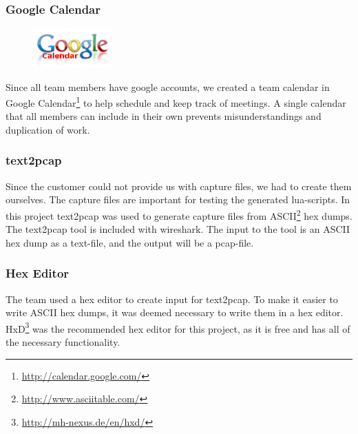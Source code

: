 \subsubsection{Google Calendar}
\begin{figure}
	\vspace{-20pt}
	\includegraphics[width=3cm]{./planning/img/google_calendar_logo}
	\vspace{-20pt}
\end{figure}
Since all team members have google accounts, we created a team calendar
in Google Calendar\footnote{\url{http://calendar.google.com/}}
to help schedule and keep track of meetings. A single calendar that all
members can include in their own prevents misunderstandings and duplication
of work.

\subsubsection{text2pcap}
Since the customer could not provide us with capture files, 
we had to create them ourselves.  The capture files are important for testing
the generated \Gls{lua}-\glspl{script}. In this project text2pcap was used to generate capture files from ASCII\footnote{\url{http://www.asciitable.com/}}
\glspl{hex dump}.  The text2pcap tool is included with \Gls{wireshark}. 
The input to the tool is an ASCII \gls{hex dump} as a text-file, and the output will
be a \gls{pcap-file}.

\subsubsection{Hex Editor}
The team used a hex editor to create input for text2pcap. To make it
easier to write ASCII \glspl{hex dump}, it was deemed necessary to write them in a hex editor.
HxD\footnote{\url{http://mh-nexus.de/en/hxd/}} was the recommended hex editor
for this project, as it is free and has all of the necessary functionality.

